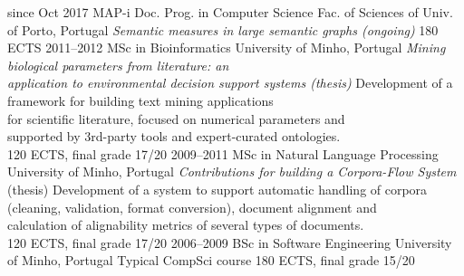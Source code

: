 \documentclass[a4paper]{friggeri-cv}
\begin{document}
\begin{entrylist}
  \entry
    {{\tiny since} Oct 2017}
    {MAP-i Doc. Prog. in Computer Science}
    {Fac. of Sciences of Univ. of Porto, Portugal}
    {\emph{Semantic measures in large semantic graphs (ongoing)}}
    {180 ECTS}
  \entry
    {2011--2012}
    {MSc in Bioinformatics}
    {University of Minho, Portugal}
    {\emph{Mining biological parameters from literature: an\\
    application to environmental decision support systems (thesis)}}
    {Development of a framework
    for building text mining applications\\
    for scientific literature, focused on numerical parameters and\\
    supported by 3rd-party tools and expert-curated
    ontologies.\\
    120 ECTS, final grade 17/20
    }
  \entry
    {2009--2011}
    {MSc in Natural Language Processing}
    {University of Minho, Portugal}
    {\emph{Contributions for building a Corpora-Flow System} (thesis)}
    {\footnotesize{Development of a system to support automatic handling of corpora\\
    (cleaning, validation, format conversion), document alignment and\\
    calculation of alignability metrics of several types of documents.}\\
    120 ECTS, final grade 17/20
    }
  \entry
    {2006--2009}
    {BSc in Software Engineering}
    {University of Minho, Portugal}
    {Typical CompSci course}
    {180 ECTS, final grade 15/20}
\end{entrylist}


\end{document}
